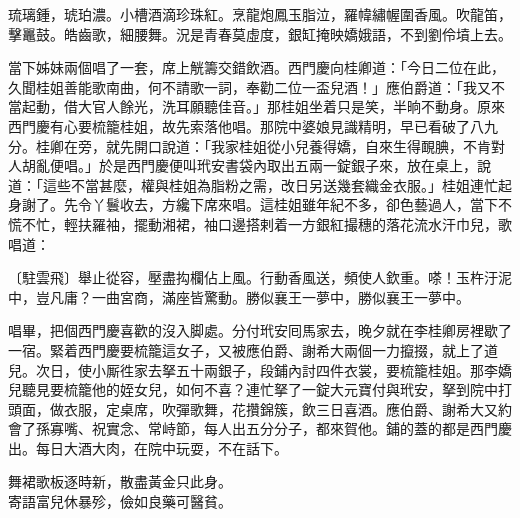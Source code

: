 \begin{myquote}
琉璃鍾，琥珀濃。小槽酒滴珍珠紅。烹龍炮鳳玉脂泣，羅幃繡幄圍香風。吹龍笛，擊鼉鼓。皓齒歌，細腰舞。況是青春莫虛度，銀缸掩映嬌娥語，不到劉伶墳上去。
\end{myquote}

當下姊妹兩個唱了一套，席上觥籌交錯飲酒。西門慶向桂卿道：「今日二位在此，久聞桂姐善能歌南曲，何不請歌一詞，奉勸二位一盃兒酒！」應伯爵道：「我又不當起動，借大官人餘光，洗耳願聽佳音。」那桂姐坐着只是笑，半晌不動身。原來西門慶有心要梳籠桂姐，故先索落他唱。那院中婆娘見識精明，早已看破了八九分。桂卿在旁，就先開口說道：「我家桂姐從小兒養得嬌，自來生得靦腆，不肯對人胡亂便唱。」於是西門慶便叫玳安書袋內取出五兩一錠銀子來，放在桌上，說道：「這些不當甚麼，權與桂姐為脂粉之需，改日另送幾套織金衣服。」桂姐連忙起身謝了。{}先令丫鬟收去，方纔下席來唱。這桂姐雖年紀不多，卻色藝過人，當下不慌不忙，輕扶羅袖，擺動湘裙，袖口邊搭剌着一方銀紅撮穗的落花流水汗巾兒，{}歌唱道：

\begin{myquote}
{\markfont〔駐雲飛〕}舉止從容，壓盡抅欄佔上風。行動香風送，頻使人欽重。嗏！玉杵汙泥中，豈凡庸？一曲宮商，滿座皆驚動。勝似襄王一夢中，勝似襄王一夢中。
\end{myquote}

唱畢，把個西門慶喜歡的沒入脚處。分付玳安囘馬家去，晚夕就在李桂卿房裡歇了一宿。緊着西門慶要梳籠這女子，又被應伯爵、謝希大兩個一力攛掇，就上了道兒。次日，使小厮徃家去拏五十兩銀子，段鋪內討四件衣裳，要梳籠桂姐。那李嬌兒聽見要梳籠他的姪女兒，{}如何不喜？連忙拏了一錠大元寶付與玳安，拏到院中打頭面，做衣服，定桌席，吹彈歌舞，花攢錦簇，飲三日喜酒。應伯爵、謝希大又約會了孫寡嘴、祝實念、常峙節，每人出五分分子，都來賀他。鋪的蓋的都是西門慶出。每日大酒大肉，在院中玩耍，不在話下。

\begin{myquote}
舞裙歌板逐時新，散盡黃金只此身。\\寄語富兒休暴殄，儉如良藥可醫貧。
\end{myquote}

